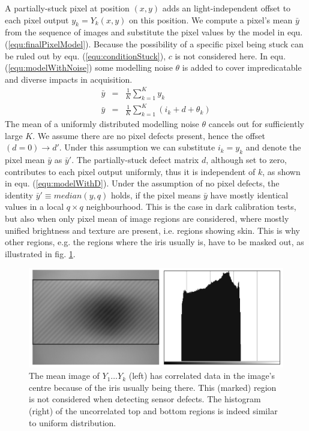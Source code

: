 \documentclass[10pt,twocolumn,letterpaper]{article}
\begin{document}
A partially-stuck pixel at position $(x,y)$ adds an light-independent offset to each pixel output $y_k = Y_k({x,y})$ on this position. We compute a pixel's mean $\bar{y}$ from the sequence of images and substitute the pixel values by the model in equ. (\ref{equ:finalPixelModel}). Because the possibility of a specific pixel being stuck can be ruled out by equ. (\ref{equ:conditionStuck}), $c$ is not considered here. In equ. (\ref{equ:modelWithNoise}) some modelling noise $\theta$ is added to cover impredicatable and diverse impacts in acquisition.
\begin{eqnarray}
\bar{y} & = & \frac{1}{K}\sum\limits_{k=1}^{K}y_k \\
\bar{y} & = & \frac{1}{K}\sum\limits_{k=1}^{K}(i_k+d+\theta_k) \label{equ:modelWithNoise}
\end{eqnarray}
The mean of a uniformly distributed modelling noise $\theta$ cancels out for sufficiently large $K$. We assume there are no pixel defects present, hence the offset $(d=0) \rightarrow d'$. Under this assumption we can substitute $i_k = y_k$ and denote the pixel mean $\bar{y}$ as $\bar{y}'$. The partially-stuck defect matrix $d$, although set to zero, contributes to each pixel output uniformly, thus it is independent of $k$, as shown in equ. (\ref{equ:modelWithD}). Under the assumption of no pixel defects, the identity $\bar{y}' \equiv median(y,q)$ holds, if the pixel means $\bar{y}$ have mostly identical values in a local $q \times q$ neighbourhood. This is the case in dark calibration tests, but also when only pixel mean of image regions are considered, where mostly unified brightness and texture are present, i.e. regions showing skin. This is why other regions, e.g. the regions where the iris usually is, have to be masked out, as illustrated in fig. \ref{fig:correlated}. 

\begin{figure}[h]
  \centering
  \includegraphics[width=\linewidth]{img/correlated.png}
  \caption{The mean image of $Y_1 \dots Y_k$ (left) has correlated data in the image's centre because of the iris usually being there. This (marked) region is not considered when detecting sensor defects. The histogram (right) of the uncorrelated top and bottom regions is indeed similar to uniform distribution.}
  \label{fig:correlated}
\end{figure}
\end{document}
